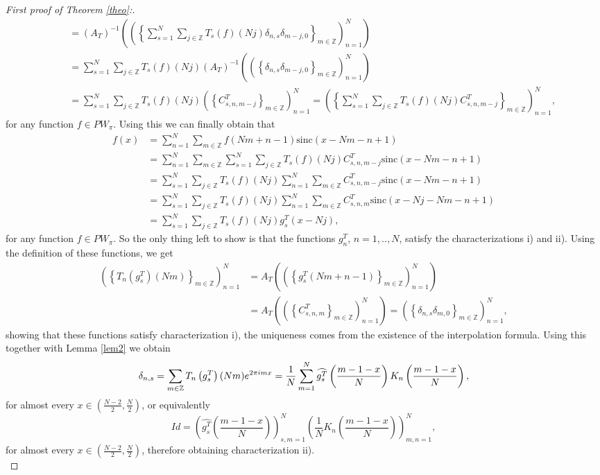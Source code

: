 \documentclass[10pt,a4paper]{amsart}
\newcommand{\Z}{{\mathbb Z}}
\newcommand{\pa}[1]{\left(#1\right)}
\newcommand{\sinc}{\mathrm{sinc}}
\newcommand{\suc}[1]{\left\{#1\right\}}
\begin{document}
\begin{proof}[First proof of Theorem \ref{theo}:]
\begin{align*}
		&\quad = \pa{A_T}^{-1}\pa{\pa{\left\{ 
		\sum_{s=1}^N \sum_{j\in\Z} T_s(f)(Nj) \delta_{n,s}\delta_{m-j,0} \right\}_{m\in\Z}}_{n=1}^N} \\
		&\quad = \sum_{s=1}^N \sum_{j\in\Z} T_s(f)(Nj)
		\pa{A_T}^{-1}\pa{\pa{\left\{ \delta_{n,s}\delta_{m-j,0} \right\}_{m\in\Z}}_{n=1}^N} \\
		&\quad = \sum_{s=1}^N \sum_{j\in\Z} T_s(f)(Nj)
		\pa{\suc{C^T_{s,n,m-j}}_{m\in\Z}}_{n=1}^N
		= \pa{\suc{\sum_{s=1}^N \sum_{j\in\Z} T_s(f)(Nj) 
		C^T_{s,n,m-j}}_{m\in\Z}}_{n=1}^N,
	\end{align*}
	for any function $f\in PW_\pi$. Using this we can finally obtain that
	\begin{align*}
		f(x) &= \sum_{n=1}^N \sum_{m\in\Z} f(Nm+n-1) \sinc(x-Nm-n+1) \\
		&= \sum_{n=1}^N \sum_{m\in\Z} \sum_{s=1}^N \sum_{j\in\Z} T_s(f)(Nj) C^T_{s,n,m-j} \sinc(x-Nm-n+1) \\
		&= \sum_{s=1}^N \sum_{j\in\Z} T_s(f)(Nj) \sum_{n=1}^N \sum_{m\in\Z} C^T_{s,n,m-j} \sinc(x-Nm-n+1) \\
		&= \sum_{s=1}^N \sum_{j\in\Z} T_s(f)(Nj) \sum_{n=1}^N \sum_{m\in\Z} C^T_{s,n,m} \sinc(x-Nj-Nm-n+1) \\
		&= \sum_{s=1}^N \sum_{j\in\Z} T_s(f)(Nj) g^T_s(x-Nj),
	\end{align*}
	for any function $f\in PW_\pi$. So the only thing left to show is that the functions $g^T_n$, $n=1,..,N$, satisfy the characterizations i) and ii). Using the definition of these functions, we get 
	\begin{align*}
		\pa{\suc{T_n\pa{g^T_s}(Nm)}_{m\in\Z}}_{n=1}^N
		&= A_T \pa{\pa{\suc{g^T_s(Nm+n-1)}_{m\in\Z}}_{n=1}^N} \\
		&= A_T \pa{\pa{\suc{C^T_{s,n,m}}_{m\in\Z}}_{n=1}^N}
		= \pa{\suc{\delta_{n,s}\delta_{m,0}}_{m\in\Z}}_{n=1}^N,
	\end{align*}
	showing that these functions satisfy characterization i), the uniqueness comes from the existence of the interpolation formula. Using this together with Lemma \ref{lem2} we obtain
	$$ \delta_{n,s} =\sum_{m\in\Z} T_n\pa{g^T_s}(Nm) e^{2\pi i m x} \\
	= \frac{1}{N} \sum_{m=1}^N \widehat{g^T_s}\pa{\frac{m-1-x}{N}} K_n\pa{\frac{m-1-x}{N}},$$
	for almost every $x\in\pa{\frac{N-2}{2},\frac{N}{2}}$, or equivalently
	$$Id= \pa{\widehat{g^T_s}\pa{\frac{m-1-x}{N}}}_{s,m=1}^N \pa{\frac{1}{N} K_n\pa{\frac{m-1-x}{N}}}_{m,n=1}^N,$$
	for almost every $x\in\pa{\frac{N-2}{2},\frac{N}{2}}$, therefore obtaining characterization ii). \\
\end{proof}
\end{document}
